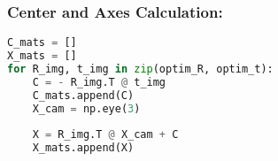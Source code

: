 \documentclass{article}
\begin{document}
\subsubsection*{Center and Axes Calculation:}
\begin{lstlisting}[language=Python]
C_mats = []
X_mats = []
for R_img, t_img in zip(optim_R, optim_t):
    C = - R_img.T @ t_img
    C_mats.append(C)
    X_cam = np.eye(3)
    
    X = R_img.T @ X_cam + C
    X_mats.append(X)

\end{lstlisting}
\end{document}

